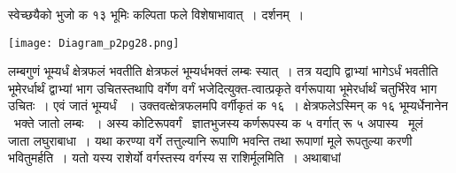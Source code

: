 \documentclass[11pt, openany]{book}
\begin{document}
\begin{sloppypar}
\noindent स्वेच्छयैको भुजो क १३ भूमिः कल्पिता फले विशेषाभावात्~। दर्शनम्~।

\begin{center}
\texttt{[image: Diagram\_p2pg28.png]}
\end{center}

\noindent लम्बगुणं भूम्यर्धं क्षेत्रफलं भवतीति क्षेत्रफलं भूम्यर्धभक्तं लम्बः स्यात्~। तत्र यद्यपि द्वाभ्यां भागेऽर्धं भवतीति भूमेरर्धार्थं द्वाभ्यां भाग उचितस्तथापि वर्गेण वर्गं भजेदित्युक्त-त्वात्प्रकृते वर्गरूपाया भूमेरर्धार्थं चतुर्भिरेव भाग उचितः~। एवं जातं भूम्यर्धं ~। उक्तवत्क्षेत्रफलमपि वर्गीकृतं क १६~। क्षेत्रफलेऽस्मिन् क १६ भूम्यर्धेनानेन \, भक्ते जातो लम्बः ~। अस्य कोटिरूपवर्गं \, ज्ञातभुजस्य कर्णरूपस्य क ५ वर्गात् रू ५ अपास्य \, मूलं \, जाता लघुराबाधा~। यथा करण्या वर्गे तत्तुल्यानि रूपाणि भवन्ति तथा रूपाणां मूले रूपतुल्या करणी भवितुमर्हति~। यतो यस्य राशेर्यो वर्गस्तस्य वर्गस्य स राशिर्मूलमिति~। अथाबाधां \;{\small $\begin{matrix}

\end{matrix}}
\end{sloppypar}
\end{document}
